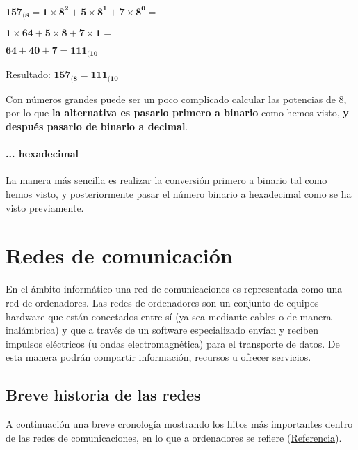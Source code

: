 \begin{center}
    \vspace{-15pt}
    $\mathbf{157_{(8} = 1\times8^2 + 5\times8^1 + 7\times8^0 = }$

    $\mathbf{1\times64 + 5\times8 + 7\times1 = }$

    $\mathbf{64 + 40 + 7 = 111_{(10}}$

    Resultado: $\mathbf{157_{(8} = 111_{(10}}$
    \vspace{-15pt}
\end{center}

Con números grandes puede ser un poco complicado calcular las potencias de 8, por lo que \textbf{la alternativa es pasarlo primero a binario} como hemos visto, \textbf{y después pasarlo de binario a decimal}.

\subsubsection*{... hexadecimal}
La manera más sencilla es realizar la conversión primero a binario tal como hemos visto, y posteriormente pasar el número binario a hexadecimal como se ha visto previamente.


\chapter{Redes de comunicación}
En el ámbito informático una red de comunicaciones es representada como una red de ordenadores. Las redes de ordenadores son un conjunto de equipos hardware que están conectados entre sí (ya sea mediante cables o de manera inalámbrica) y que a través de un software especializado envían y reciben impulsos eléctricos (u ondas electromagnética) para el transporte de datos. De esta manera podrán compartir información, recursos u ofrecer servicios.


\section{Breve historia de las redes}
A continuación una breve cronología mostrando los hitos más importantes dentro de las redes de comunicaciones, en lo que a ordenadores se refiere (\href{https://en.wikipedia.org/wiki/Computer_network}{Referencia}).

